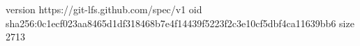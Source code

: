 version https://git-lfs.github.com/spec/v1
oid sha256:0c1ecf023aa8465d1df318468b7e4f14439f5223f2c3e10cf5dbf4ca11639bb6
size 2713
